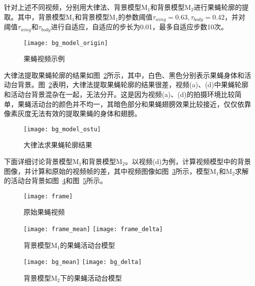 针对上述不同视频，分别用大律法、背景模型$\textrm{M}_1$和背景模型$\textrm{M}_2$进行果蝇轮廓的提取。其中，背景模型$\textrm{M}_1$和背景模型$\textrm{M}_1$的参数阈值$\tau_{wing} = 0.63, \tau_{body} = 0.42$，并对阈值$\tau_{wing}$和$\tau_{body}$进行自适应，自适应的步长为0.01，最多自适应步数10次。

\begin{figure}
\centering
\texttt{[image: bg\_model\_origin]}
\caption{果蝇视频示例}
\label{fig:bg_model_origin}
\end{figure}

大律法提取果蝇轮廓的结果如图~\ref{fig:bg_model_ostu}所示，其中，白色、黑色分别表示果蝇身体和活动台背景。图~\ref{fig:bg_model_ostu}表明，大律法提取果蝇轮廓的结果很差，视频(a)、(d)中果蝇轮廓和活动台背景混杂在一起，无法分开。这是因为视频(a)、(d)的拍摄环境比较简单，果蝇活动台的颜色并不均一，其暗色部分和果蝇翅膀效果比较接近，仅仅依靠像素灰度无法有效的提取果蝇的身体和翅膀。

\begin{figure}
\centering
\texttt{[image: bg\_model\_ostu]}
\caption{大律法求果蝇轮廓结果}
\label{fig:bg_model_ostu}
\end{figure}

下面详细讨论背景模型$\textrm{M}_1$和背景模型$\textrm{M}_2$。以视频(d)为例，计算视频模型中的背景图像，并计算和原始的视频帧的差，其中视频图像如图~\ref{fig:frame}所示，模型$\textrm{M}_1$和$\textrm{M}_2$求解的活动台背景如图~\ref{fig:frame_mean_model1}和图~\ref{fig:frame_mean_model2}所示。

\begin{figure}
\centering
\texttt{[image: frame]}
\caption{原始果蝇视频}\label{fig:frame}
\end{figure}

\begin{figure}
\centering
{} {
    \texttt{[image: frame\_mean]}
}
\hspace{10pt}
 {
    \texttt{[image: frame\_delta]}
}
\caption{背景模型$\textrm{M}_1$的果蝇活动台模型}
\label{fig:frame_mean_model1}
\end{figure}

\begin{figure}
\centering
{} {
    \texttt{[image: bg\_mean]}
}
\hspace{10pt}
 {
    \texttt{[image: bg\_delta]}
}
\caption{背景模型$\textrm{M}_2$下的果蝇活动台模型}
\label{fig:frame_mean_model2}
\end{figure}

